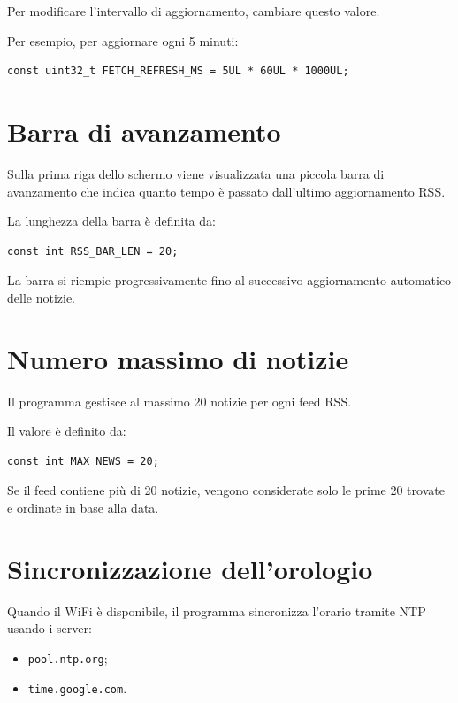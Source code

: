 \documentclass[11pt,a4paper]{article}
\begin{document}
	Per modificare l'intervallo di aggiornamento, cambiare questo valore.
	
	Per esempio, per aggiornare ogni 5 minuti:
	
	\begin{lstlisting}[style=codice]
		const uint32_t FETCH_REFRESH_MS = 5UL * 60UL * 1000UL;
	\end{lstlisting}
	
	\section{Barra di avanzamento}
	
	Sulla prima riga dello schermo viene visualizzata una piccola barra di avanzamento che indica quanto tempo è passato dall'ultimo aggiornamento RSS.
	
	La lunghezza della barra è definita da:
	
	\begin{lstlisting}[style=codice]
		const int RSS_BAR_LEN = 20;
	\end{lstlisting}
	
	La barra si riempie progressivamente fino al successivo aggiornamento automatico delle notizie.
	
	\section{Numero massimo di notizie}
	
	Il programma gestisce al massimo 20 notizie per ogni feed RSS.
	
	Il valore è definito da:
	
	\begin{lstlisting}[style=codice]
		const int MAX_NEWS = 20;
	\end{lstlisting}
	
	Se il feed contiene più di 20 notizie, vengono considerate solo le prime 20 trovate e ordinate in base alla data.
	
	\section{Sincronizzazione dell'orologio}
	
	Quando il WiFi è disponibile, il programma sincronizza l'orario tramite NTP usando i server:
	
	\begin{itemize}
		\item \texttt{pool.ntp.org};
		\item \texttt{time.google.com}.
	\end{itemize}
	
\end{document}

